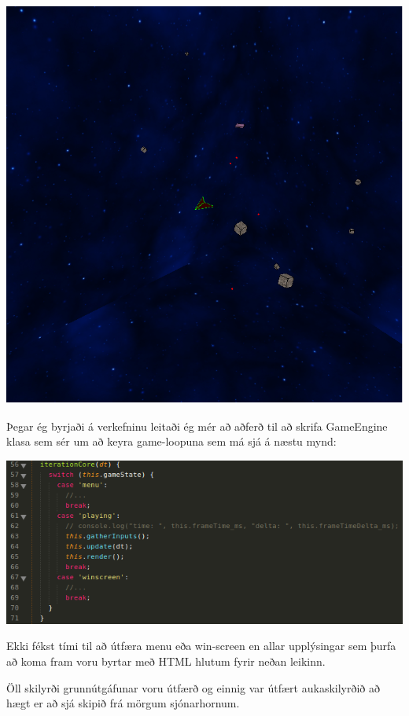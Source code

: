 \documentclass[11pt]{article}
\begin{document}
\begin{flushleft}
{\centering\includegraphics[scale = 0.2]{m2.png}\\}

\newpage
Þegar ég byrjaði á verkefninu leitaði ég mér að aðferð til að skrifa GameEngine klasa sem sér um að keyra game-loopuna sem má sjá á næstu mynd:\par
{\centering\includegraphics[scale = 0.5]{m3.png}\\}

Ekki fékst tími til að útfæra menu eða win-screen en allar upplýsingar sem þurfa að koma fram voru byrtar með HTML hlutum fyrir neðan leikinn.

Öll skilyrði grunnútgáfunar voru útfærð og einnig var útfært aukaskilyrðið að hægt er að sjá skipið frá mörgum sjónarhornum.
\end{flushleft}
\end{document}
